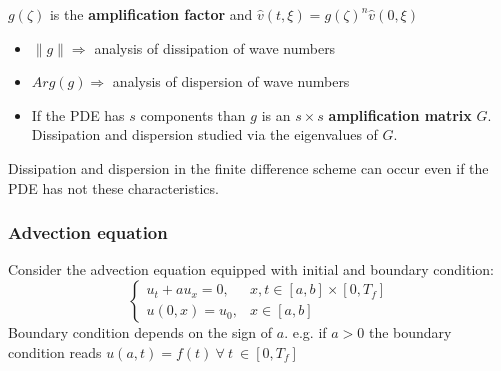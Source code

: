 \documentclass{beamer}
\begin{document}
\begin{frame}
$g(\zeta)$ is the \textbf{amplification factor} and $\hat{v}(t,\xi) = g(\zeta)^n\hat{v}(0,\xi)$
\begin{itemize}
\setlength\itemsep{1em}
\item $\|g\| \Rightarrow$ analysis of dissipation of wave numbers
\item $Arg(g) \Rightarrow$ analysis of dispersion of wave numbers
\item If the PDE has $s$ components than $g$ is an $s \times s$ \textbf{amplification matrix} $G$. Dissipation and dispersion studied via the eigenvalues of $G$.
\cite{doi:10.1137/1.9780898718911}
\end{itemize}
Dissipation and dispersion in the finite difference scheme can occur even if the PDE has not these characteristics.
\end{frame}
\begin{frame}
\frametitle{Advection equation}
Consider the advection equation equipped with initial and boundary condition:
$$
\begin{cases}
u_t + a u_x = 0, & x,t \in [a,b] \times [0,T_f] \\
u(0,x) = u_0, & x \in [a,b]
\end{cases}
$$
Boundary condition depends on the sign of $a$. e.g. if $a > 0$ the boundary condition reads $u(a,t) = f(t) \ \forall \ t \ \in [0,T_f]$
\end{frame}
\end{document}
